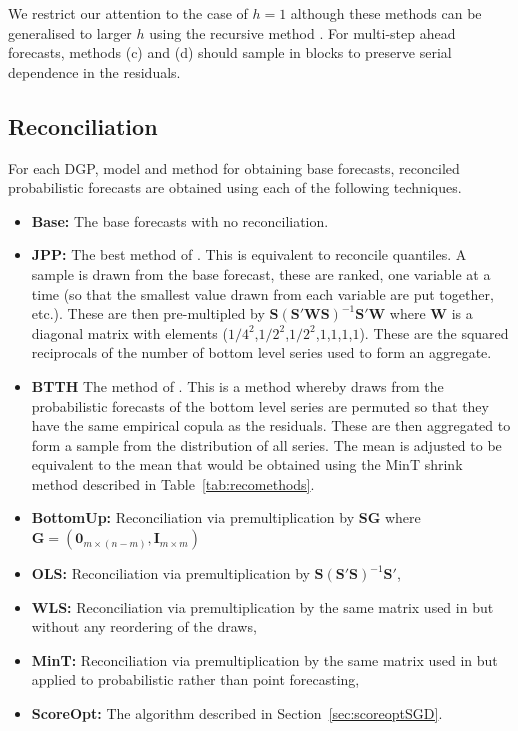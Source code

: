 \documentclass[12pt]{article}
\theoremstyle{definition}
\begin{document}
We restrict our attention to the case of $h=1$ although these methods can be generalised to larger $h$ using the recursive method \citep{FPP2018}.  For multi-step ahead forecasts, methods (c) and (d) should sample in blocks to preserve serial dependence in the residuals.

\subsection{Reconciliation}

For each DGP, model and method for obtaining base forecasts, reconciled probabilistic forecasts are obtained using each of the following techniques.

\begin{itemize}
	\item \textbf{Base:} The base forecasts with no reconciliation.
	\item \textbf{JPP:} The best method of \cite{JeoEtAl2019}.  This is equivalent to reconcile quantiles.  A sample is drawn from the base forecast, these are ranked, one variable at a time (so that the smallest value drawn from each variable are put together, etc.).  These are then pre-multipled by $\bm{S}\left(\bm{S}'\bm{W}\bm{S}\right)^{-1}\bm{S}'\bm{W}$ where $\bm{W}$ is a diagonal matrix with elements ($1/4^2$,$1/2^2$,$1/2^2$,$1$,$1$,$1$,$1$).  These are the squared reciprocals of the number of bottom level series used to form an aggregate.
	\item \textbf{BTTH} The method of \cite{Taieb2017}.  This is a method whereby draws from the probabilistic forecasts of the bottom level series are permuted so that they have the same empirical copula as the residuals.  These are then aggregated to form a sample from the distribution of all series.  The mean is adjusted to be equivalent to the mean that would be obtained using the MinT shrink method \cite{WicEtAl2019} described in Table~\ref{tab:recomethods}. 
	\item \textbf{BottomUp:} Reconciliation via premultiplication by $\bm{S}\bm{G}$ where $\bm{G}=\left(\bm{0}_{m\times(n-m)},\bm{I}_{m\times m}\right)$ 
	\item \textbf{OLS:} Reconciliation via premultiplication by $\bm{S}\left(\bm{S}'\bm{S}\right)^{-1}\bm{S}'$,
	\item \textbf{WLS:} Reconciliation via premultiplication by the same matrix used in \cite{JeoEtAl2019} but without any reordering of the draws,
	\item \textbf{MinT:} Reconciliation via premultiplication by the same matrix used in \cite{WicEtAl2019} but applied to probabilistic rather than point forecasting,
	\item \textbf{ScoreOpt:} The algorithm described in Section~\ref{sec:scoreoptSGD}.
\end{itemize}
\end{document}
